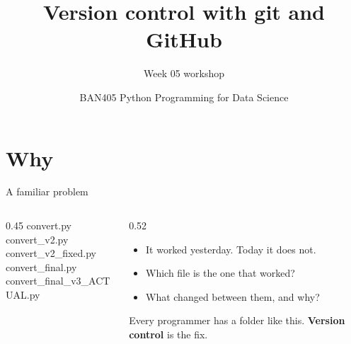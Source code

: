 \documentclass[aspectratio=169,11pt]{beamer}
\title{Version control with git and GitHub}
\subtitle{Week 05 workshop}
\author{BAN405 Python Programming for Data Science}
\date{}
\newcommand{\key}[1]{\textbf{\textcolor{ban}{#1}}}
\begin{document}
\maketitle

\section{Why}

\begin{frame}{A familiar problem}
  \begin{columns}[T]
    \begin{column}{0.45\textwidth}
      \ttfamily\small
      convert.py\\
      convert\_v2.py\\
      convert\_v2\_fixed.py\\
      convert\_final.py\\
      convert\_final\_v3\_ACTUAL.py
    \end{column}
    \begin{column}{0.52\textwidth}
      \begin{itemize}
        \item It worked yesterday. Today it does not.
        \item Which file is the one that worked?
        \item What changed between them, and why?
      \end{itemize}
      \vspace{1em}
      Every programmer has a folder like this. \key{Version control} is the fix.
    \end{column}
  \end{columns}
\end{frame}
\end{document}
